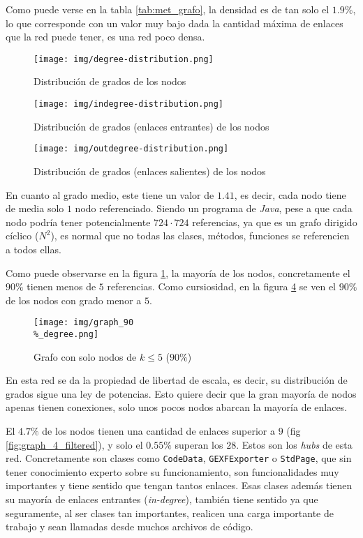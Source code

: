 \documentclass[12pt,letterpaper]{article}
\begin{document}
Como puede verse en la tabla \ref{tab:met_grafo}, la densidad es de tan solo el $1.9\%$, lo que corresponde con un valor muy bajo dada la cantidad máxima de enlaces que la red puede tener, es una red poco densa.

\begin{figure}[htp]
    \centering
    \texttt{[image: img/degree-distribution.png]}
    \caption{Distribución de grados de los nodos}
    \label{fig:degree_distribution}
\end{figure}

\begin{figure}[htp]
    \centering
    \texttt{[image: img/indegree-distribution.png]}
    \caption{Distribución de grados (enlaces entrantes) de los nodos}
    \label{fig:indegree_distribution}
\end{figure}


\begin{figure}[htp]
    \centering
    \texttt{[image: img/outdegree-distribution.png]}
    \caption{Distribución de grados (enlaces salientes) de los nodos}
    \label{fig:outdegree_distribution}
\end{figure}

En cuanto al grado medio, este tiene un valor de $1.41$, es decir, cada nodo tiene de media solo $1$ nodo referenciado. Siendo un programa de \textit{Java}, pese a que cada nodo podría tener potencialmente $724\cdot724$ referencias, ya que es un grafo dirigido cíclico ($N^2$), es normal que no todas las clases, métodos, funciones se referencien a todos ellas.

Como puede observarse en la figura \ref{fig:degree_distribution}, la mayoría de los nodos, concretamente el $90\%$ tienen menos de $5$ referencias. Como cursiosidad, en la figura \ref{fig:graph_90_filtered} se ven el $90\%$ de los nodos con grado menor a $5$.

\begin{figure}[htp]
    \centering
    \texttt{[image: img/graph\_90\\\%\_degree.png]}
    \caption{Grafo con solo nodos de $k\le 5$ ($90\%$)}
    \label{fig:graph_90_filtered}
\end{figure}

En esta red se da la propiedad de libertad de escala, es decir, su distribución de grados sigue una ley de potencias. Esto quiere decir que la gran mayoría de nodos apenas tienen conexiones, solo unos pocos nodos abarcan la mayoría de enlaces.

El $4.7\%$ de los nodos tienen una cantidad de enlaces superior a $9$ (fig \ref{fig:graph_4_filtered}), y solo el $0.55\%$ superan los $28$. Estos son los \textit{hubs} de esta red. Concretamente son clases como \texttt{CodeData}, \texttt{GEXFExporter} o \texttt{StdPage}, que sin tener conocimiento experto sobre su funcionamiento, son funcionalidades muy importantes y tiene sentido que tengan tantos enlaces. Esas clases además tienen su mayoría de enlaces entrantes (\textit{in-degree}), también tiene sentido ya que seguramente, al ser clases tan importantes, realicen una carga importante de trabajo y sean llamadas desde muchos archivos de código.
\end{document}
